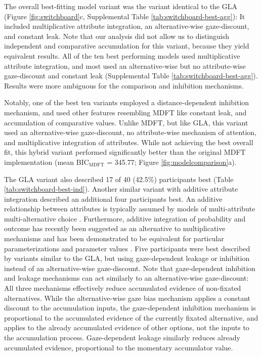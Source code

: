 \documentclass[11pt, a4paper]{article}
\begin{document}
The overall best-fitting model variant was the variant identical to the GLA (Figure \ref{fig:switchboard}c, Supplemental Table \ref{tab:switchboard-best-agg}): It included multiplicative attribute integration, an alternative-wise gaze-discount, and constant leak. Note that our analysis did not allow us to distinguish independent and comparative accumulation for this variant, because they yield equivalent results. All of the ten best performing models used multiplicative attribute integration, and most used an alternative-wise but no attribute-wise gaze-discount and constant leak (Supplemental Table \ref{tab:switchboard-best-agg}). Results were more ambiguous for the comparison and inhibition mechanisms.

Notably, one of the best ten variants employed a distance-dependent inhibition mechanism, and used other features resembling MDFT like constant leak, and accumulation of comparative values. Unlike MDFT, but like GLA, this variant used an alternative-wise gaze-discount, no attribute-wise mechanism of attention, and multiplicative integration of attributes. While not achieving the best overall fit, this hybrid variant performed significantly better than the original MDFT implementation (mean BIC$_{\text{MDFT}}$ = 345.77; Figure \ref{fig:modelcomparison}a).

The GLA variant also described 17 of 40 (42.5\%) participants best (Table \ref{tab:switchboard-best-ind}). Another similar variant with additive attribute integration described an additional four participants best. An additive relationship between attributes is typically assumed by models of multi-attribute multi-alternative choice \parencite[e.g.,][]{roe2001MultialternativeDecisionField,usher2004LossAversionInhibition}. Furthermore, additive integration of probability and outcome has recently been suggested as an alternative to multiplicative mechanisms and has been demonstrated to be equivalent for particular parameterizations and parameter values \parencite{rouault2019PrefrontalMechanismsCombining}. Five participants were best described by variants similar to the GLA, but using gaze-dependent leakage or inhibition instead of an alternative-wise gaze-discount. Note that gaze-dependent inhibition and leakage mechanisms can act similarly to an alternative-wise gaze-discount: All three mechanisms effectively reduce accumulated evidence of non-fixated alternatives. While the alternative-wise gaze bias mechanism applies a constant discount to the accumulation inputs, the gaze-dependent inhibition mechanism is proportional to the accumulated evidence of the currently fixated alternative, and applies to the already accumulated evidence of other options, not the inputs to the accumulation process. Gaze-dependent leakage similarly reduces already accumulated evidence, proportional to the momentary accumulator value.
\end{document}

